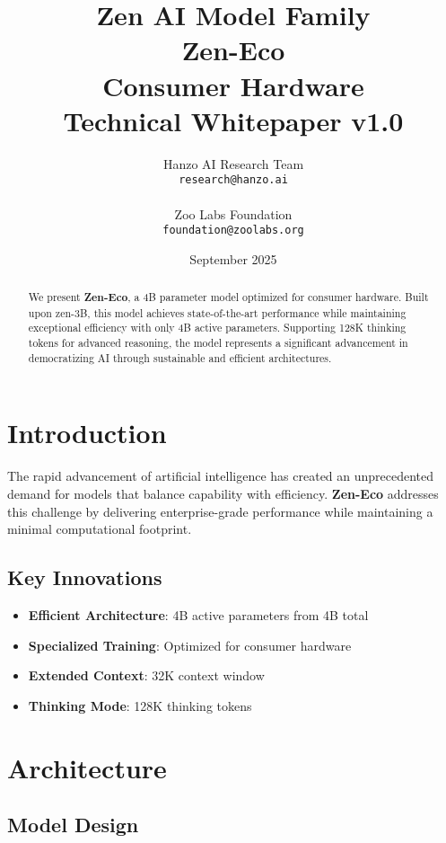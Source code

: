 \documentclass[11pt,a4paper]{article}
\title{
    \vspace{-2cm}
    \Large \textbf{Zen AI Model Family} \\
    \vspace{0.5cm}
    \Huge \textbf{Zen-Eco} \\
    \vspace{0.3cm}
    \large Consumer Hardware \\
    \vspace{0.5cm}
    \normalsize Technical Whitepaper v1.0
}
\author{
    Hanzo AI Research Team \\
    \texttt{research@hanzo.ai} \\
    \\
    Zoo Labs Foundation \\
    \texttt{foundation@zoolabs.org}
}
\date{September 2025}
\begin{document}
\maketitle

\begin{abstract}
We present \textbf{Zen-Eco}, a 4B parameter model optimized for consumer hardware. 
Built upon zen-3B, this model achieves state-of-the-art performance while maintaining exceptional efficiency 
with only 4B active parameters. Supporting 128K thinking tokens for advanced reasoning, the model represents a significant advancement in democratizing AI through sustainable and efficient architectures.
\end{abstract}

\tableofcontents
\newpage

\section{Introduction}

The rapid advancement of artificial intelligence has created an unprecedented demand for models that balance capability with efficiency. 
\textbf{Zen-Eco} addresses this challenge by delivering enterprise-grade performance while maintaining a minimal computational footprint.

\subsection{Key Innovations}
\begin{itemize}
    \item \textbf{Efficient Architecture}: 4B active parameters from 4B total
    \item \textbf{Specialized Training}: Optimized for consumer hardware
    \item \textbf{Extended Context}: 32K context window
    \item \textbf{Thinking Mode}: 128K thinking tokens
    
    
\end{itemize}

\section{Architecture}

\subsection{Model Design}
\end{document}
